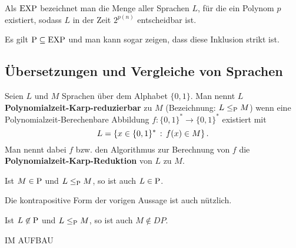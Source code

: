 \begin{defn}
	Als $\operatorname{EXP}$ bezeichnet man die Menge aller Sprachen $L$, für die ein Polynom $p$ existiert, sodass $L$  in der Zeit $2^{p(n)}$ entscheidbar ist. 
\end{defn} 

\begin{bem}
	Es gilt $\operatorname{P}\subseteq \operatorname{EXP}$ und man kann sogar zeigen, dass diese Inklusion strikt ist. 
\end{bem} 

\subsection{Übersetzungen und Vergleiche von Sprachen}

\begin{defn}
	Seien $L$ und $M$ Sprachen über dem Alphabet $\{0,1\}$. Man nennt $L$ \textbf{Polynomialzeit-Karp-reduzierbar} zu $M$ (Bezeichnung: $L \le_{\operatorname{P}} M$) wenn eine Polynomialzeit-Berechenbare Abbildung $f : \{0,1\}^\ast \to \{0,1\}^\ast$ existiert mit 
	\[
		L = \left\{ x \in \{0,1\}^\ast \,:\,  f(x) \in M \right\}.
	\]  
	Man nennt dabei $f$ bzw. den Algorithmus zur Berechnung von $f$ die \textbf{Polynomialzeit-Karp-Reduktion} von $L$ zu $M$. 
\end{defn} 

\begin{prop}
	Ist $M \in \operatorname{P}$ und $L \le_{\operatorname{P}} M$, so ist auch $L \in \operatorname{P}$. 
\end{prop} 

\begin{bem}
	Die kontrapositive Form der vorigen Aussage ist auch nützlich. 
\end{bem}

\begin{prop}
	Ist $L \not\in \operatorname{P}$ und $L \le_{\operatorname{P}} M$, so ist auch $M \not\in DP$. 
\end{prop} 

IM AUFBAU 

